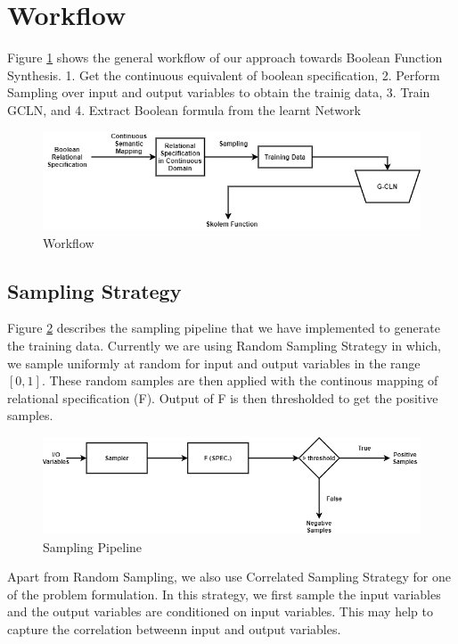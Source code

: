 \section{Workflow}
Figure \ref{fig:workflow} shows the general workflow of our approach towards Boolean Function Synthesis.
1. Get the continuous equivalent of boolean specification, 2. Perform Sampling over input and output variables to obtain the trainig data,
3. Train GCLN, and 4. Extract Boolean formula from the learnt Network

\begin{figure}[t]
	\centering
    \includegraphics[scale=0.5]{workflow_bfs.png}
    \caption{Workflow}
    \label{fig:workflow}
\end{figure}

\subsection{Sampling Strategy}
Figure \ref{fig:sampling} describes the sampling pipeline that we have implemented to generate the training data.
Currently we are using Random Sampling Strategy in which, 
we sample uniformly at random for input and output variables in the range $[0, 1]$. 
These random samples are then applied with the continous mapping of relational specification (F). 
Output of F is then thresholded to get the positive samples. 

\begin{figure}
	\centering
    \includegraphics[scale=0.5]{sampling_bfs.png}
    \caption{Sampling Pipeline}
    \label{fig:sampling}
\end{figure}

Apart from Random Sampling, we also use Correlated Sampling Strategy for one of the problem formulation. 
In this strategy, we first sample the input variables and the output variables are conditioned on input variables. 
This may help to capture the correlation betweenn input and output variables.

